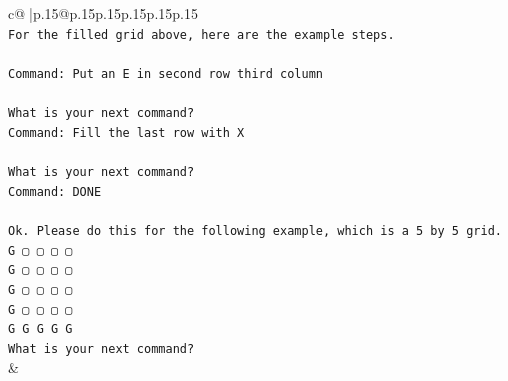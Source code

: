 \documentclass{article}
\begin{document}
{\begin{supertabular}{c@{$\;$}|p{.15\linewidth}@{}p{.15\linewidth}p{.15\linewidth}p{.15\linewidth}p{.15\linewidth}p{.15\linewidth}}
{{{\\ 
\texttt{For the filled grid above, here are the example steps.} \\
\\ 
\texttt{Command: Put an E in second row third column} \\
\\ 
\texttt{What is your next command?} \\
\texttt{Command: Fill the last row with X} \\
\\ 
\texttt{What is your next command?} \\
\texttt{Command: DONE} \\
\\ 
\texttt{Ok. Please do this for the following example, which is a 5 by 5 grid.} \\
\texttt{G ▢ ▢ ▢ ▢} \\
\texttt{G ▢ ▢ ▢ ▢} \\
\texttt{G ▢ ▢ ▢ ▢} \\
\texttt{G ▢ ▢ ▢ ▢} \\
\texttt{G G G G G} \\
\texttt{What is your next command?} \\
            }
        }
    }
    & \\ \\


\end{supertabular}}
\end{document}
